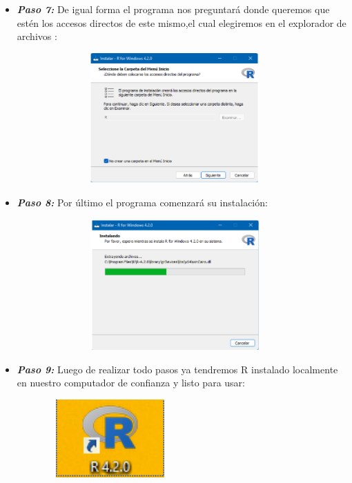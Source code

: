 \documentclass{article}
\begin{document}
\begin{itemize}
\begin{figure}[H]
\caption{\label{fig5}}
\end{figure}
\item \textbf{\textit{Paso 7: }}De igual forma el programa nos preguntará donde queremos que estén los accesos directos de este mismo,el cual elegiremos en el explorador de archivos :
\begin{figure}[H]
\centering
\includegraphics[width=10cm,height=5cm]{imagenes/Paso7.png}
\caption{\label{fig6}}
\end{figure}
\item \textbf{\textit{Paso 8: }}Por último el programa comenzará su instalación: 
\begin{figure}[H]
\centering
\includegraphics[width=10cm,height=5cm]{imagenes/Paso8.png}
\caption{\label{fig7}}
\end{figure}
\item \textbf{\textit{Paso 9: }}Luego de realizar todo  pasos ya tendremos R instalado localmente en nuestro computador de  confianza y listo para usar:
\begin{figure}[H]
\centering
\includegraphics[width=5cm,height=3cm]{imagenes/Paso9.png}
\caption{\label{fig8}}
\end{figure}
\end{itemize}
\end{document}
